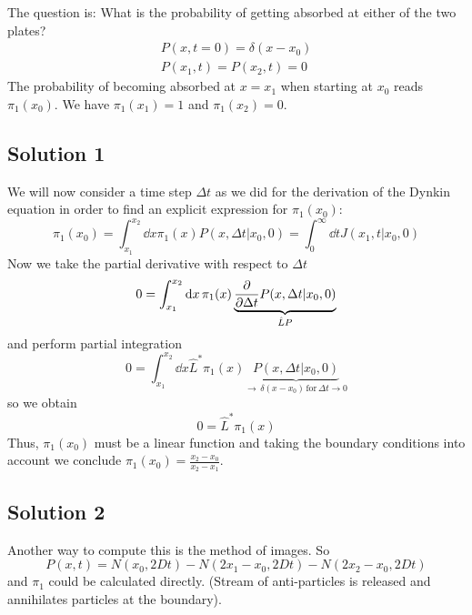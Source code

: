 \documentclass{notebook}
\begin{document}
The question is: What is the probability of getting absorbed at either of the two plates?
%
\begin{align*}
P(x, t=0) = \delta(x-x_0) \\
P(x_1, t) = P(x_2, t) = 0
\end{align*}
%
The probability of becoming absorbed at $x = x_1$ when starting at $x_0$ reads $\pi_1(x_0)$. We have $\pi_1(x_1) = 1$ and $\pi_1(x_2) = 0$.


\subsection*{Solution 1}

We will now consider a time step $\Delta t$ as we did for the derivation of the Dynkin equation in order to find an explicit expression for $\pi_1(x_0)$:
%
\begin{equation*}
\pi_1(x_0) = \int_{x_1}^{x_2} \dd{x} \pi_1(x) P(x, \Delta t | x_0, 0) 
= \int_{0}^{\infty} \dd{t} J(x_1,t | x_0,0)
\end{equation*}
%
Now we take the partial derivative with respect to $\Delta t$ 
%
\begin{equation*}
0 = \int_{x_1}^{x_2} \dd{x} \pi_1(x) \underbrace{\pdv{\Delta t} P(x, \Delta t | x_0, 0)}_{\hat{L} P}
\end{equation*}
%
and perform partial integration
%
\begin{equation*}
0 = \int_{x_1}^{x_2} \dd{x} \hat{L}^* \pi_1(x) \underbrace{P(x, \Delta t | x_0, 0)}_{\to \, \delta(x-x_0) \, \mathrm{for} \, \Delta t \to 0}
\end{equation*}
%
so we obtain
%
\begin{equation*}
0 = \hat{L}^* \pi_1(x)
\end{equation*}
%
Thus, $\pi_1(x_0)$ must be a linear function and taking the boundary conditions into account we conclude $\pi_1(x_0) = \frac{x_2-x_0}{x_2-x_1}$.


\subsection*{Solution 2}

Another way to compute this is the method of images. So 
%
\begin{equation}
P(x,t) = N(x_0, 2Dt) - N(2x_1-x_0, 2Dt) - N(2x_2 - x_0, 2Dt)
\end{equation}
%
and $\pi_1$ could be calculated directly. (Stream of anti-particles is released and annihilates particles at the boundary).
\end{document}
